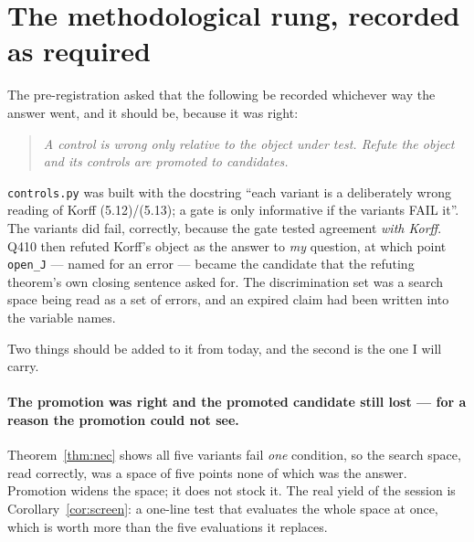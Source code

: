 \documentclass[11pt]{article}
\theoremstyle{plain}
\theoremstyle{definition}
\begin{document}
\section{The methodological rung, recorded as required}

The pre-registration asked that the following be recorded whichever way the answer went, and it
should be, because it was right:

\begin{quote}
\emph{A control is wrong only relative to the object under test. Refute the object and its
controls are promoted to candidates.}
\end{quote}

\texttt{controls.py} was built with the docstring ``each variant is a deliberately wrong reading
of Korff (5.12)/(5.13); a gate is only informative if the variants FAIL it''. The variants did
fail, correctly, because the gate tested agreement \emph{with Korff}. Q410 then refuted Korff's
object as the answer to \emph{my} question, at which point \texttt{open\_J} --- named for an
error --- became the candidate that the refuting theorem's own closing sentence asked for.
The discrimination set was a search space being read as a set of errors, and an expired claim
had been written into the variable names.

Two things should be added to it from today, and the second is the one I will carry.

\paragraph{The promotion was right and the promoted candidate still lost --- for a reason the
promotion could not see.} Theorem~\ref{thm:nec} shows all five variants fail \emph{one}
condition, so the search space, read correctly, was a space of five points none of which was the
answer. Promotion widens the space; it does not stock it. The real yield of the session is
Corollary~\ref{cor:screen}: a one-line test that evaluates the whole space at once, which is
worth more than the five evaluations it replaces.
\end{document}
